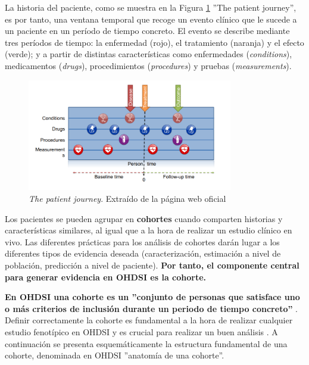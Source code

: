 La historia del paciente,  como se muestra en la Figura \ref{fig:patientJourney} ''The patient journey'', es por tanto, una ventana temporal que recoge un evento clínico que le sucede a un paciente en un período de tiempo concreto. El evento se describe mediante tres períodos de tiempo: la enfermedad (rojo), el tratamiento (naranja) y el efecto (verde); y a partir de distintas características como enfermedades (\textit{conditions}), medicamentos (\textit{drugs}), procedimientos (\textit{procedures}) y pruebas (\textit{measurements}).

\begin{figure}[H]
    \centering
    \includegraphics[width=0.80\textwidth]{figures/patientJourney.png}
     \caption{\textit{The patient journey}. Extraído de la página web oficial \cite{OHDSIbook}}
    \label{fig:patientJourney}
\end{figure}

Los pacientes se pueden agrupar en \textbf{cohortes} cuando comparten historias y características similares, al igual que a la hora de realizar un estudio clínico en vivo. Las diferentes  prácticas para los análisis de cohortes darán lugar a los diferentes tipos de evidencia deseada (caracterización, estimación a nivel de población, predicción a nivel de paciente). \textbf{Por tanto, el componente central para generar evidencia en OHDSI es la cohorte.}


\textbf{En OHDSI una cohorte es un ''conjunto de personas que satisface uno o más criterios de inclusión durante un periodo de tiempo concreto''} \cite{OHDSIbook}. Definir correctamente la cohorte es fundamental a la hora de realizar cualquier estudio fenotípico en OHDSI y es crucial para realizar un buen análisis \cite{hripcsak2018high}. A continuación se presenta esquemáticamente la estructura fundamental de una cohorte, denominada en OHDSI ''anatomía de una cohorte''.

